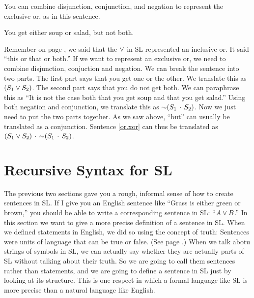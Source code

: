 You can combine disjunction, conjunction, and negation to represent the exclusive or, as in this sentence. 

\begin{earg}
\item[\ex{or.xor}] You get either soup or salad, but not both.
\end{earg}

Remember on page \pageref{def:inclusive_or}, we said that the $\vee$ in SL represented an inclusive or. It said ``this or that or both.'' If we want to represent an exclusive or, we need to combine disjunction, conjuction and negation. We can break the sentence into two parts. The first part says that you get one or the other. We translate this as $(S_1 \vee S_2)$. The second part says that you do not get both. We can paraphrase this as ``It is not the case both that you get soup and that you get salad.'' Using both negation and conjunction, we translate this as $\mathord{\sim}(S_1 \,\cdot\, S_2)$. Now we just need to put the two parts together. As we saw above, ``but'' can usually be translated as a conjunction. Sentence \ref{or.xor} can thus be translated as $(S_1 \vee S_2) \,\cdot\, \mathord{\sim}(S_1 \,\cdot\, S_2)$.

\label{recursive_syntax_for_SL}

\section{Recursive Syntax for SL} %

The previous two sections gave you a rough, informal sense of how to create sentences in SL. If I give you an English sentence like ``Grass is either green or brown,'' you should be able to write a corresponding sentence in SL: ``$A \vee B$.'' In this section we want to give a more precise definition of a sentence in SL.  When we defined statements in English, we did so using the concept of truth: Sentences were units of language that can be true or false. (See page \pageref{def:statement}.) When we talk abotu strings of symbols in SL, we can actually say whether they are actually parts of SL without talking about their truth. So we are going to call them sentences rather than statements, and we are going to define a sentence in SL just by looking at its structure. This is one respect in which a formal language like SL is more precise than a natural language like English.

